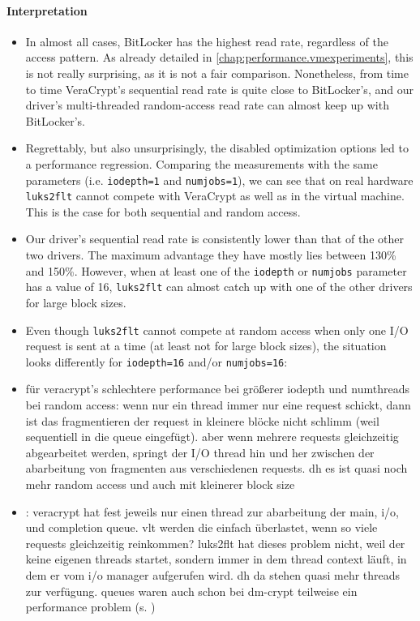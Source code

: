 \paragraph{Interpretation}
\begin{itemize}
	\item In almost all cases, BitLocker has the highest read rate, regardless of the access pattern. As already detailed in \autoref{chap:performance.vmexperiments}, this is not really surprising, as it is not a fair comparison. Nonetheless, from time to time VeraCrypt's sequential read rate is quite close to BitLocker's, and our driver's multi-threaded random-access read rate can almost keep up with BitLocker's.
	\item Regrettably, but also unsurprisingly, the disabled optimization options led to a performance regression. Comparing the measurements with the same parameters (i.e. \texttt{iodepth=1} and \texttt{numjobs=1}), we can see that on real hardware \texttt{luks2flt} cannot compete with VeraCrypt as well as in the virtual machine. This is the case for both sequential and random access. 
	\item Our driver's sequential read rate is consistently lower than that of the other two drivers. The maximum advantage they have mostly lies between 130\% and 150\%. However, when at least one of the \texttt{iodepth} or \texttt{numjobs} parameter has a value of 16, \texttt{luks2flt} can almost catch up with one of the other drivers for large block sizes.
	\item Even though \texttt{luks2flt} cannot compete at random access when only one I/O request is sent at a time (at least not for large block sizes), the situation looks differently for \texttt{iodepth=16} and/or \texttt{numjobs=16}: 
	\item {} für veracrypt's schlechtere performance bei größerer iodepth und numthreads bei random access: wenn nur ein thread immer nur eine request schickt, dann ist das fragmentieren der request in kleinere blöcke nicht schlimm (weil sequentiell in die queue eingefügt). aber wenn mehrere requests gleichzeitig abgearbeitet werden, springt der I/O thread hin und her zwischen der abarbeitung von fragmenten aus verschiedenen requests. dh es ist quasi noch mehr random access und auch mit kleinerer block size 
	\item {}: veracrypt hat fest jeweils nur einen thread zur abarbeitung der main, i/o, und completion queue. vlt werden die einfach überlastet, wenn so viele requests gleichzeitig reinkommen? luks2flt hat dieses problem nicht, weil der keine eigenen threads startet, sondern immer in dem thread context läuft, in dem er vom i/o manager aufgerufen wird. dh da stehen quasi mehr threads zur verfügung. queues waren auch schon bei dm-crypt teilweise ein performance problem (s. \cite{Korchagin2020})
\end{itemize}

